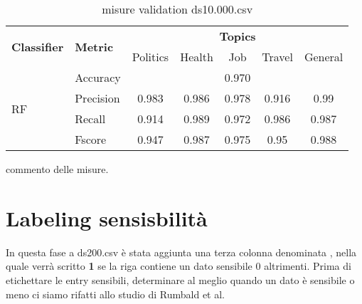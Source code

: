 \begin{table}[h]
\begin{tabular}{|l|l|c|c|c|c|c|}
\hline
\multirow{2}{*}{\textbf{Classifier}} & \multirow{2}{*}{\textbf{Metric}} & \multicolumn{5}{c|}{\textbf{Topics}} \\ \cline{3-7} 
 &  & Politics & Health & Job & Travel & General \\ \hline
\multirow{4}{*}{RF} & Accuracy & \multicolumn{5}{c|}{0.970} \\ \cline{2-7} 
 & Precision & 0.983 & 0.986 & 0.978 & 0.916 & 0.99 \\ \cline{2-7} 
 & Recall & 0.914 & 0.989 & 0.972 & 0.986 & 0.987 \\ \cline{2-7} 
 & Fscore & 0.947 & 0.987 & 0.975 & 0.95 & 0.988 \\ \hline
\end{tabular}
\caption{misure validation ds10.000.csv}
\end{table}
\FloatBarrier
commento delle misure.\newline

\section{Labeling sensisbilità}
In questa fase a ds200.csv è stata aggiunta una terza colonna denominata , nella quale verrà scritto \textbf{1} se la riga contiene un dato sensibile 0 altrimenti.\newline
Prima di etichettare le entry sensibili, determinare al meglio quando un dato è sensibile o meno ci siamo rifatti allo studio di Rumbald et al.\cite{dataSpectrum}

